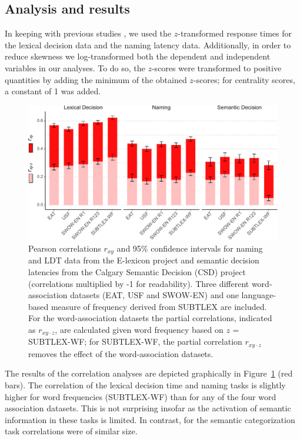 \documentclass[a4paper,doc,natbib,floatsintext]{apa6}
\begin{document}
\subsection{Analysis and results}

In keeping with previous studies \citep{BalotaYap2007,BrysbaertNew2009}, we used the $z$-transformed response times for the lexical decision data and the naming latency data. Additionally, in order to reduce skewness we log-transformed both the dependent and independent variables in our analyses. To do so, the $z$-scores were transformed to positive quantities by adding the minimum of the obtained $z$-scores; for centrality scores, a constant of 1 was added.

\begin{figure}[ht]
\centering
\includegraphics[width=14cm]{figures/LexicalProcessing.pdf}
\caption{Pearson correlations $r_{xy}$ and 95\% confidence intervals for naming and LDT data from the E-lexicon project and semantic decision latencies from the Calgary Semantic Decision (CSD) project (correlations multiplied by -1 for readability). Three different word-association datasets (EAT, USF and SWOW-EN) and one language-based measure of frequency derived from SUBTLEX are included. For the word-association datasets the partial correlations, indicated as $r_{xy\cdot z}$, are calculated given word frequency based on $z$ = SUBTLEX-WF; for SUBTLEX-WF, the partial correlation $r_{xy\cdot z}$ removes the effect of the word-association datasets.} \label{figure:frequencyCorrelation}
\end{figure}



The results of the correlation analyses are depicted graphically in Figure~\ref{figure:frequencyCorrelation} (red bars). The correlation of the lexical decision time and naming tasks is slightly higher for word frequencies (SUBTLEX-WF) than for any of the four word association datasets. This is not surprising insofar as the activation of semantic information in these tasks is limited. In contrast, for the semantic categorization task correlations were of similar size.
\end{document}
